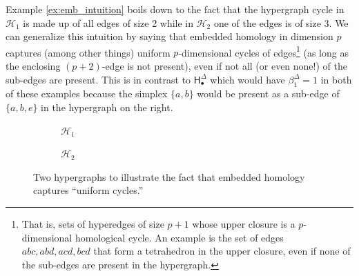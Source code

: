 \documentclass{amsart}
\newcommand{\Hgroup}	     {\mathsf{H}}
\renewcommand{\hom}[2]{\Hgroup_{#2}^{#1}}
\newcommand{\betti}[2]{\beta_{#2}^{#1}}
\renewcommand{\H}{\mathcal{H}}
\begin{document}
Example \ref{ex:emb_intuition} boils down to the fact that the hypergraph cycle in $\H_1$ is made up of all edges of size 2 while in $\H_2$ one of the edges is of size 3. We can generalize this intuition by saying that embedded homology in dimension $p$ captures (among other things) uniform $p$-dimensional cycles of edges\footnote{That is, sets of hyperedges of size $p+1$ whose upper closure is a $p$-dimensional homological cycle. An example is the set of edges $abc, abd, acd, bcd$ that form a tetrahedron in the upper closure, even if none of the sub-edges are present in the hypergraph.} (as long as the enclosing $(p+2)$-edge is not present), even if not all (or even none!) of the sub-edges are present. This is in contrast to $\hom{\Delta}{\bullet}$ which would have $\betti{\Delta}{1}=1$ in both of these examples because the simplex $\{a, b\}$ would be present as a sub-edge of $\{a, b, e\}$ in the hypergraph on the right. 

\begin{figure}
\centering
\begin{subfigure}{.45\textwidth}
  \centering
  \caption{$\mathcal{H}_1$}
  \label{hyperg1}
\end{subfigure}
%
\begin{subfigure}{.45\textwidth}
  \centering
  \caption{$\mathcal{H}_2$}
  \label{hyperg2}
\end{subfigure}
    \caption{Two hypergraphs to illustrate the fact that embedded homology captures ``uniform cycles.''}
    \label{fig:emb_hom_uniform_cycles}
\end{figure}
\end{document}

